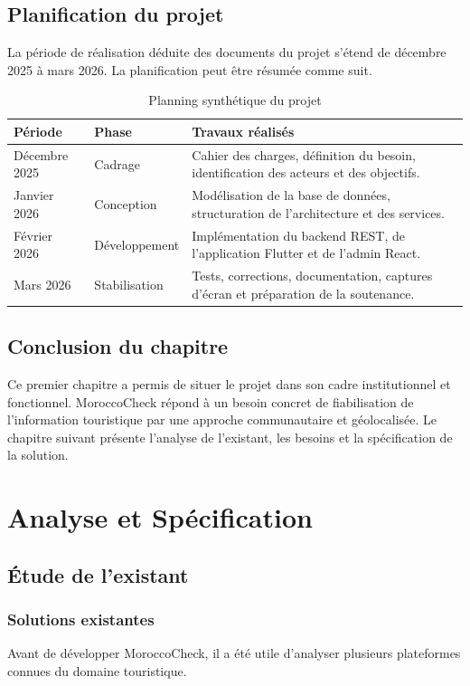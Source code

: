 ﻿\documentclass[12pt,a4paper]{report}
\begin{document}
\section{Planification du projet}
La p\'eriode de r\'ealisation d\'eduite des documents du projet s'\'etend de d\'ecembre 2025 \`a mars 2026. La planification peut \^etre r\'esum\'ee comme suit.

\begin{table}[H]
\centering
\caption{Planning synth\'etique du projet}
\begin{tabularx}{\textwidth}{p{3cm}p{3cm}Y}
\toprule
\textbf{P\'eriode} & \textbf{Phase} & \textbf{Travaux r\'ealis\'es} \\
\midrule
D\'ecembre 2025 & Cadrage & Cahier des charges, d\'efinition du besoin, identification des acteurs et des objectifs. \\
Janvier 2026 & Conception & Mod\'elisation de la base de donn\'ees, structuration de l'architecture et des services. \\
F\'evrier 2026 & D\'eveloppement & Impl\'ementation du backend REST, de l'application Flutter et de l'admin React. \\
Mars 2026 & Stabilisation & Tests, corrections, documentation, captures d'\'ecran et pr\'eparation de la soutenance. \\
\bottomrule
\end{tabularx}
\end{table}

\section{Conclusion du chapitre}
Ce premier chapitre a permis de situer le projet dans son cadre institutionnel et fonctionnel. MoroccoCheck r\'epond \`a un besoin concret de fiabilisation de l'information touristique par une approche communautaire et g\'eolocalis\'ee. Le chapitre suivant pr\'esente l'analyse de l'existant, les besoins et la sp\'ecification de la solution.

\chapter{Analyse et Sp\'ecification}

\section{\'Etude de l'existant}
\subsection{Solutions existantes}
Avant de d\'evelopper MoroccoCheck, il a \'et\'e utile d'analyser plusieurs plateformes connues du domaine touristique.
\end{document}
